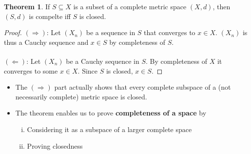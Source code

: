 \documentclass[10pt,a4paper]{article}
\theoremstyle{definition}
\theoremstyle{cor}
\theoremstyle{theorem}
\newtheorem{theorem}{Theorem}
\theoremstyle{lemma}
\theoremstyle{example}
\begin{document}
\begin{theorem}
If $S \subseteq X$ is a subset of a complete metric space $(X, d)$, then $(S, d)$ is compelte iff $S$ is closed.
\end{theorem}
\begin{proof}
$(\Rightarrow)$: Let $(X_n)$ be a sequence in $S$ that converges to $x\in X$. $(X_n)$ is thus a Cauchy sequence and $x\in S$ by completeness of $S$. \\ \\
$(\Leftarrow)$: Let $(X_n)$ be a Cauchy sequence in $S$. By completeness of $X$ it converges to some $x \in X$. Since $S$ is closed, $x \in S$. 
\end{proof}
\begin{itemize}
\item The $(\Rightarrow)$ part actually shows that every complete subspace of a (not necessarily complete) metric space is closed.
\item The theorem enables us to prove \textbf{completeness of a space} by 
\begin{enumerate}[(i)]
\item Considering it as a subspace of a larger complete space 
\item Proving closedness
\end{enumerate}
\end{itemize} 
\end{document}
